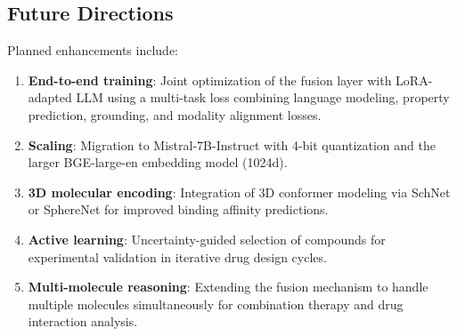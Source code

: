 \documentclass[conference]{IEEEtran}
\begin{document}
\subsection{Future Directions}

Planned enhancements include:
\begin{enumerate}
    \item \textbf{End-to-end training}: Joint optimization of the fusion layer with LoRA-adapted LLM using a multi-task loss combining language modeling, property prediction, grounding, and modality alignment losses.
    \item \textbf{Scaling}: Migration to Mistral-7B-Instruct with 4-bit quantization and the larger BGE-large-en embedding model (1024d).
    \item \textbf{3D molecular encoding}: Integration of 3D conformer modeling via SchNet or SphereNet for improved binding affinity predictions.
    \item \textbf{Active learning}: Uncertainty-guided selection of compounds for experimental validation in iterative drug design cycles.
    \item \textbf{Multi-molecule reasoning}: Extending the fusion mechanism to handle multiple molecules simultaneously for combination therapy and drug interaction analysis.
\end{enumerate}


\end{document}
